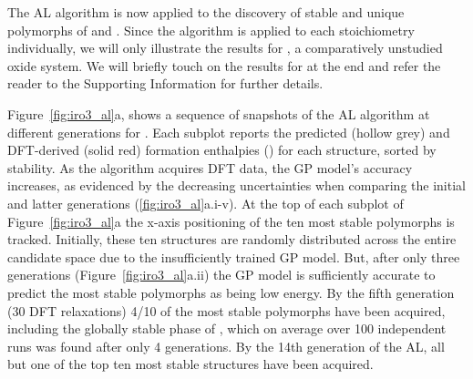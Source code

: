 %



%
The AL algorithm is now applied to the discovery of stable and unique polymorphs of \IrOtwo and \IrOthree.
%
Since the algorithm is applied to each stoichiometry individually,
we will only illustrate the results for \IrOthree,
a comparatively unstudied oxide system.
%
We will briefly touch on the results for \IrOtwo at the end and refer the reader to the Supporting Information for further details.


%
%
Figure~\ref{fig:iro3_al}a, shows a sequence of snapshots of the AL algorithm at different generations for \IrOthree.
%
Each subplot reports the predicted (hollow grey) and DFT-derived (solid red) formation enthalpies (\DHf) for each structure, sorted by stability.
%
As the algorithm acquires DFT data, the GP model's accuracy increases,
as evidenced by the decreasing uncertainties when comparing the initial and latter generations (\ref{fig:iro3_al}a.i-v).
%
At the top of each subplot of Figure~\ref{fig:iro3_al}a the x-axis positioning of the ten most stable polymorphs is tracked.
%
Initially, these ten structures are randomly distributed across the entire candidate space due to the insufficiently trained GP model.
%
But, after only three generations (Figure~\ref{fig:iro3_al}a.ii) the GP model is sufficiently accurate to predict the most stable polymorphs as being low energy.
%
By the fifth generation (\num{30} DFT relaxations) \num{4/10} of the most stable polymorphs have been acquired,
including the globally stable phase of \IrOthree, which on average over 100 independent runs was found after only 4 generations.
%
By the 14th generation of the AL,
all but one of the top ten most stable structures have been acquired.


